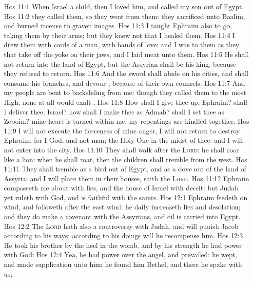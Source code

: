 \vs Hos 11:1 When Israel  a child, then I loved him, and called my son out of Egypt.
\vs Hos 11:2  they called them, so they went from them: they sacrificed unto Baalim, and burned incense to graven images.
\vs Hos 11:3 I taught Ephraim also to go, taking them by their arms; but they knew not that I healed them.
\vs Hos 11:4 I drew them with cords of a man, with bands of love: and I was to them as they that take off the yoke on their jaws, and I laid meat unto them.
\vs Hos 11:5 He shall not return into the land of Egypt, but the Assyrian shall be his king, because they refused to return.
\vs Hos 11:6 And the sword shall abide on his cities, and shall consume his branches, and devour , because of their own counsels.
\vs Hos 11:7 And my people are bent to backsliding from me: though they called them to the most High, none at all would exalt .
\vs Hos 11:8 How shall I give thee up, Ephraim?  shall I deliver thee, Israel? how shall I make thee as Admah?  shall I set thee as Zeboim? mine heart is turned within me, my repentings are kindled together.
\vs Hos 11:9 I will not execute the fierceness of mine anger, I will not return to destroy Ephraim: for I  God, and not man; the Holy One in the midst of thee: and I will not enter into the city.
\vs Hos 11:10 They shall walk after the \textsc{Lord}: he shall roar like a lion: when he shall roar, then the children shall tremble from the west.
\vs Hos 11:11 They shall tremble as a bird out of Egypt, and as a dove out of the land of Assyria: and I will place them in their houses, saith the \textsc{Lord}.
\vs Hos 11:12 Ephraim compasseth me about with lies, and the house of Israel with deceit: but Judah yet ruleth with God, and is faithful with the saints.
\vs Hos 12:1 Ephraim feedeth on wind, and followeth after the east wind: he daily increaseth lies and desolation; and they do make a covenant with the Assyrians, and oil is carried into Egypt.
\vs Hos 12:2 The \textsc{Lord} hath also a controversy with Judah, and will punish Jacob according to his ways; according to his doings will he recompense him.
\vs Hos 12:3 He took his brother by the heel in the womb, and by his strength he had power with God:
\vs Hos 12:4 Yea, he had power over the angel, and prevailed: he wept, and made supplication unto him: he found him  Bethel, and there he spake with us;
